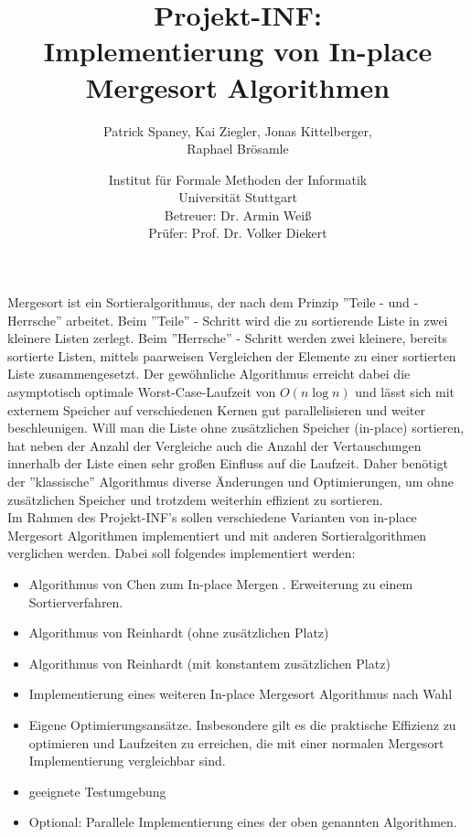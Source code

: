 \documentclass[12pt,pdftex,a4paper]{article}
\begin{document}
\title{Projekt-INF:\\
Implementierung von In-place Mergesort Algorithmen}
\author{Patrick Spaney, Kai Ziegler, Jonas Kittelberger, \\ Raphael Brösamle}
\date{Institut für Formale Methoden der Informatik \\ Universität Stuttgart\\
\normalsize Betreuer: Dr. Armin Weiß\\
Prüfer: Prof. Dr. Volker Diekert}
\maketitle
Mergesort ist ein Sortieralgorithmus, der nach dem Prinzip ''Teile - und - Herrsche'' arbeitet. Beim ''Teile'' - Schritt wird die zu
sortierende Liste in zwei kleinere Listen zerlegt. Beim ''Herrsche'' - Schritt werden zwei kleinere, bereits sortierte Listen,
mittels paarweisen Vergleichen der Elemente zu einer sortierten Liste zusammengesetzt.
Der gewöhnliche Algorithmus erreicht dabei die asymptotisch optimale Worst-Case-Laufzeit von $O(n \log n)$ und
lässt sich mit externem Speicher auf verschiedenen Kernen gut parallelisieren und weiter beschleunigen.
Will man die Liste ohne zusätzlichen Speicher (in-place) sortieren, hat neben der Anzahl der Vergleiche
auch die Anzahl der Vertauschungen innerhalb der Liste einen sehr großen Einfluss auf die Laufzeit.
Daher benötigt der ''klassische'' Algorithmus diverse Änderungen und Optimierungen, um ohne
zusätzlichen Speicher und trotzdem weiterhin effizient zu sortieren. \vspace*{5mm} \\
Im Rahmen des Projekt-INF's sollen verschiedene Varianten von in-place Mergesort Algorithmen implementiert und mit anderen Sortieralgorithmen verglichen werden.
Dabei soll folgendes implementiert werden:
\begin{itemize}
\item Algorithmus von Chen zum In-place Mergen \cite{Chen06}. Erweiterung zu einem Sortierverfahren. 
\item Algorithmus von Reinhardt \cite{Reinhardt92} (ohne zusätzlichen Platz)
\item Algorithmus von Reinhardt (mit konstantem zusätzlichen Platz)
\item Implementierung eines weiteren In-place Mergesort Algorithmus nach Wahl
\item Eigene Optimierungsansätze. Insbesondere gilt es die praktische Effizienz zu optimieren und Laufzeiten zu erreichen, die mit einer normalen Mergesort Implementierung vergleichbar sind. 
\item geeignete Testumgebung
\item Optional: Parallele Implementierung eines der oben genannten Algorithmen.
\end{itemize}
\end{document}

